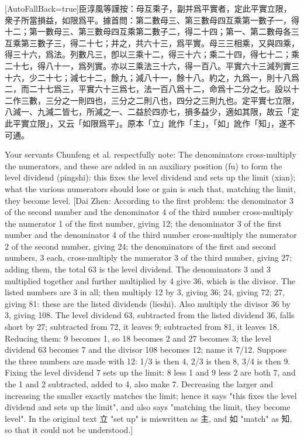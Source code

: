 \documentclass[11pt]{article}
\newcommand{\zhsmall}{\footnotesize\color{black!70}}
\newcommand{\unitlabel}[1]{\marginpar{\raggedleft\tiny\color{gray}#1}}
\newenvironment{unitzh}{\par\CJKfontspec{Noto Serif CJK SC}[AutoFallBack=true]\large\linespread{1.25}\selectfont}{\par}
\newenvironment{uniten}{\par\small\color{black!85}}{\par\medskip}
\begin{document}
\begin{unitzh}\unitlabel{jiuzhang-007.7}臣淳風等謹按：母互乘子，副并爲平實者，定此平實立限，衆子所當損益，如限爲平。{\zhsmall 據首問：第二數母三、第三數母四互乘第一數子一，得十二；第一數母三、第三數母四互乘第二數子二，得二十四；第一、第二數母各三互乘第三數子三，得二十七；并之，共六十三，爲平實。母三三相乘，又與四乘，得三十六，爲法。列數凡三，卽以三乘十二，得三十六；乘二十四，得七十二；乘二十七，得八十一，爲列實。亦以三乘法三十六，得一百八。平實六十三減列實三十六，少二十七；減七十二，餘九；減八十一，餘十八。約之，九爲一，則十八爲二，而二十七爲三，平實六十三爲七，法一百八爲十二，命爲十二分之七。設以十二作三數，三分之一則四也，三分之二則八也，四分之三則九也。定平實七立限，八減一、九減二皆七，所減之一、二益於四亦七，損多益少，適如其限，故云「定此平實立限」，又云「如限爲平」。原本「立」訛作「主」，「如」訛作「知」，遂不可通。}\end{unitzh}
\begin{uniten}Your servants Chunfeng et al. respectfully note: The denominators cross-multiply the numerators, and these are added in an auxiliary position (fu) to form the level dividend (pingshi): this fixes the level dividend and sets up the limit (xian); what the various numerators should lose or gain is such that, matching the limit, they become level. [Dai Zhen: According to the first problem: the denominator 3 of the second number and the denominator 4 of the third number cross-multiply the numerator 1 of the first number, giving 12; the denominator 3 of the first number and the denominator 4 of the third number cross-multiply the numerator 2 of the second number, giving 24; the denominators of the first and second numbers, 3 each, cross-multiply the numerator 3 of the third number, giving 27; adding them, the total 63 is the level dividend. The denominators 3 and 3 multiplied together and further multiplied by 4 give 36, which is the divisor. The listed numbers are 3 in all; then multiply 12 by 3, giving 36; 24, giving 72; 27, giving 81: these are the listed dividends (lieshi). Also multiply the divisor 36 by 3, giving 108. The level dividend 63, subtracted from the listed dividend 36, falls short by 27; subtracted from 72, it leaves 9; subtracted from 81, it leaves 18. Reducing them: 9 becomes 1, so 18 becomes 2 and 27 becomes 3; the level dividend 63 becomes 7 and the divisor 108 becomes 12; name it 7/12. Suppose the three numbers are made with 12: 1/3 is then 4, 2/3 is then 8, 3/4 is then 9. Fixing the level dividend 7 sets up the limit: 8 less 1 and 9 less 2 are both 7, and the 1 and 2 subtracted, added to 4, also make 7. Decreasing the larger and increasing the smaller exactly matches the limit; hence it says "this fixes the level dividend and sets up the limit", and also says "matching the limit, they become level". In the original text 立 "set up" is miswritten as 主, and 如 "match" as 知, so that it could not be understood.]\end{uniten}
\end{document}
